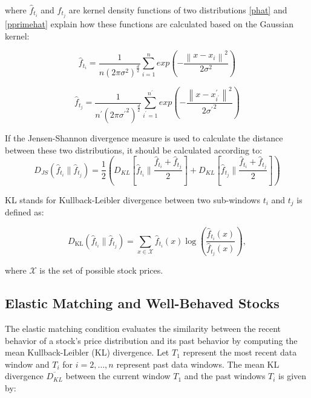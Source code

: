 \documentclass[preprint,12pt,authoryear]{elsarticle}
\begin{document}
where $\hat{f}_{t_i}$ and $\hat{f}_{t_j}$ are kernel density functions of two distributions  \ref{phat} and \ref{pprimehat} explain how these functions are calculated based on the Gaussian kernel:

\begin{equation} \label{phat}
    \hat{f}_{t_i}= \frac{1}{n(2\pi \sigma^2)^\frac{d}{2}}\sum_{i=1}^{n}exp(-\frac{\left\| x-x_{i} \right\|^2}{2\sigma ^2})
\end{equation}

\begin{equation} \label{pprimehat}
    \hat{f}_{t_j}= \frac{1}{n^{\prime}(2\pi {\sigma^{\prime}}^2)^\frac{d}{2}}\sum_{i^{\prime}=1}^{n^{\prime}}exp(-\frac{\left\| x-x^{\prime}_{i^{\prime}} \right\|^2}{2{\sigma^{\prime}}^2 })
\end{equation}

If the Jensen-Shannon divergence measure is used to calculate the distance between these two distributions, it should be calculated according to:
\begin{equation}\label{JS}
    D_{JS}(\hat{f}_{t_i}\parallel \hat{f}_{t_j})=\frac{1}{2}\left(D_{KL}\left[ \hat{f}_{t_i}\parallel\frac{\hat{f}_{t_i}+\hat{f}_{t_j}}{2} \right] + D_{KL}\left[ \hat{f}_{t_j}\parallel\frac{\hat{f}_{t_i}+\hat{f}_{t_j}}{2} \right]\right)
\end{equation}

KL stands for Kullback-Leibler divergence between two sub-windows \( t_i \) and \( t_j \) is defined as:

\begin{equation}\label{eq:kl_divergence_subwindows}
    D_{\text{KL}}(\hat{f}_{t_i} \parallel \hat{f}_{t_j}) = \sum_{x \in \mathcal{X}} \hat{f}_{t_i}(x) \log\left(\frac{\hat{f}_{t_i}(x)}{\hat{f}_{t_j}(x)}\right),
\end{equation}

where \( \mathcal{X} \) is the set of possible stock prices.


\subsection{Elastic Matching and Well-Behaved Stocks}
\label{sec:welbehaved}


The elastic matching condition evaluates the similarity between the recent behavior of a stock's price distribution and its past behavior by computing the mean Kullback-Leibler (KL) divergence. Let \( T_1 \) represent the most recent data window and \( T_i \) for \( i = 2, \dots, n \) represent past data windows. The mean KL divergence \( \overline{D_{KL}} \) between the current window \( T_1 \) and the past windows \( T_i \) is given by:
\end{document}
